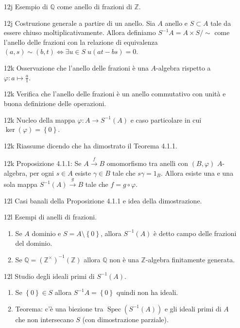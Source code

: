 \documentclass[italian]{article}
\begin{document}
	\begin{enumerate}
      \item[12j] Esempio di $\mathbb{Q}$ come anello di frazioni di
        $\mathbb{Z}$. 
      \item[12j] Costruzione generale a partire di un anello. Sia $A$ anello
        e $S\subset A$ tale da essere chiuso moltiplicativamente. Allora
        definiamo $S^{-1} A = A \times S / \sim$ come l'anello delle frazioni
        con la relazione di equivalenza $(a,s) \sim (b,t) \iff \exists u \in S\;
        u(at - bs) = 0$. 
      \item[12k] Osservazione che l'anello delle frazioni è una $A$-algebra
        rispetto a $\varphi \colon a \mapsto \frac{a}{1}$. 
      \item[12k] Verifica che l'anello delle frazioni è un anello commutativo
        con unità e buona definizione delle operazioni.
      \item[12k] Nucleo della mappa $\varphi \colon A \to S^{-1}(A)$ e caso
        particolare in cui $\ker(\varphi) = \left\{ 0 \right\}$.
      \item[12k] Riassume dicendo che ha dimostrato il Teorema 4.1.1\cite{vergura}.
      \item[12k] Proposizione 4.1.1\cite{vergura}: Se $A \xrightarrow{f} B$ omomorfismo 
        tra anelli con $(B, \varphi)$ $A$-algebra, per ogni $s \in A$ esiste $\gamma \in B$ 
        tale che $s\gamma = 1_B$. Allora esiste una e una sola mappa 
        $S^{-1}(A) \xrightarrow{g} B$ tale che $f = g \circ \varphi$.
      \item[12l] Casi banali della Proposizione 4.1.1 \cite{vergura}
        e idea della dimostrazione.
      \item[12l] Esempi di anelli di frazioni.
        \begin{enumerate}
          \item Se $A$ dominio e $S = A \setminus \left\{ 0 \right\}$, allora
            $S^{-1}(A)$ è detto campo delle frazioni del dominio.
          \item Se $\mathbb{Q} = (\mathbb{Z}^\times)^{-1}(\mathbb{Z})$ allora
            $\mathbb{Q}$ non è una $\mathbb{Z}$-algebra finitamente generata. 
        \end{enumerate}
      \item[12l] Studio degli ideali primi di $S^{-1}(A)$.
        \begin{enumerate}
          \item Se $\left\{ 0 \right\} \in S$ allora $S^{-1}A = \left\{ 0
            \right\}$ quindi non ha ideali.
          \item Teorema: c'è una biezione tra $\operatorname{Spec}(S^{-1}(A))$
            e gli ideali primi di $A$ che non intersecano $S$ (con
            dimostrazione parziale).
        \end{enumerate}
	\end{enumerate}  
\end{document}
